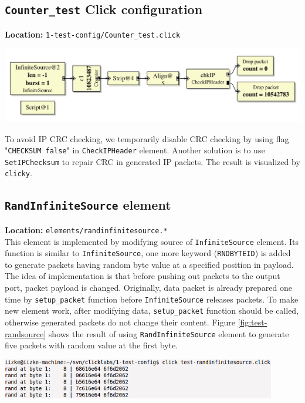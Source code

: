 \documentclass[a4paper]{article}
\begin{document}
  \subsection{\texttt{Counter\_test} Click configuration}
  \textbf{Location:} \texttt{1-test-config/Counter\_test.click} \\
  \begin{center}
	  \includegraphics[scale=0.6]{counter_test.pdf}
	  \label{fig:countertest}
  \end{center}
  To avoid IP CRC checking, we temporarily disable CRC checking by using flag "\texttt{CHECKSUM false}" in \texttt{CheckIPHeader} element. Another solution is to use \texttt{SetIPChecksum} to repair CRC in generated IP packets. The result is visualized by \texttt{clicky}. 
  \subsection{\texttt{RandInfiniteSource} element}
  \textbf{Location:} \texttt{elements/randinfinitesource.*} \\
  This element is implemented by modifying source of \texttt{InfiniteSource} element. Its function is similar to \texttt{InfiniteSource}, one more keyword (\texttt{RNDBYTEID}) is added to generate packets having random byte value at a specified position in payload. The idea of implementation is that before pushing out packets to the output port, packet payload is changed. Originally, data packet is already prepared one time by \texttt{setup\_packet} function before \texttt{InfiniteSource} releases packets. To make new element work, after modifying data, \texttt{setup\_packet} function should be called, otherwise generated packets do not change their content. Figure \ref{fig:test-randsource} shows the result of using \texttt{RandInfiniteSource} element to generate five packets with random value at the first byte.
  \begin{center}
	\includegraphics[width=0.9\textwidth]{test-randinfinitesource.png}
	\label{fig:test-randsource}
  \end{center}
\end{document}
